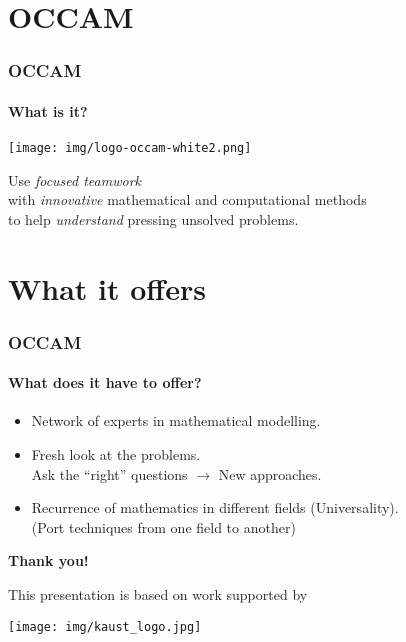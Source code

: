 \documentclass{beamer}
\begin{document}
\section{OCCAM}

\begin{frame}\frametitle{OCCAM}
\framesubtitle{What is it?}

\centerline{\texttt{[image: img/logo-occam-white2.png]}}

\bigskip

\pause
Use \emph{focused teamwork}\\
\pause
with \emph{innovative} mathematical and computational methods\\
\pause
to help \emph{understand} pressing unsolved problems.

\bigskip

\end{frame}

\section{What it offers}

\begin{frame}\frametitle{OCCAM}
\framesubtitle{What does it have to offer?}

\begin{itemize}

\item Network of experts in mathematical modelling.
\pause

\item Fresh look at the problems.\\
Ask the ``right'' questions $\to$ New approaches.
\pause

\item Recurrence of mathematics in different fields (Universality).\\
{\tiny (Port techniques from one field to another)}

\end{itemize}

\end{frame}


\begin{frame}
\center

\vfill

{
\Huge\color{occammedium}
\textbf{Thank you!}
}

\vfill

{\tiny
This presentation is based on work supported by

\smallskip

\texttt{[image: img/kaust\_logo.jpg]}
}

\end{frame}
\end{document}
